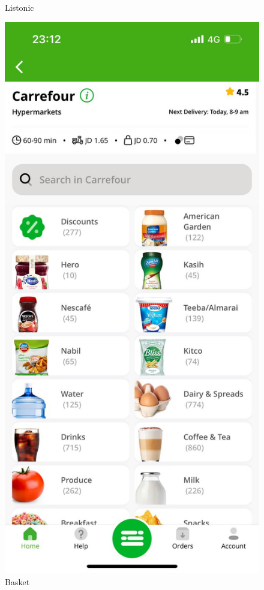 \begin{figure}[h]
\begin{minipage}[t]{0.4\linewidth}
			\centering
			\caption{Listonic}
			\label{fig:listonic}
			\end{minipage}\hfill
			\begin{minipage}[t]{0.4\linewidth}
			\includegraphics[width = \linewidth]{slike/basket_primjer.JPEG}
			\caption{Basket}
			\label{fig:basket}
			\end{minipage}
		\end{figure}


